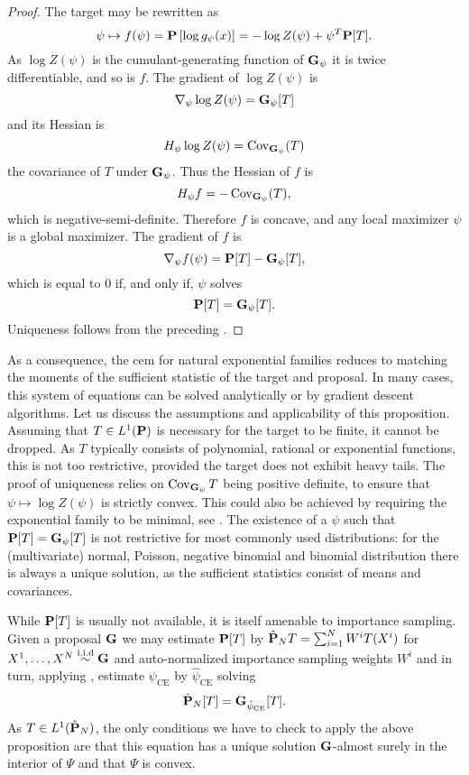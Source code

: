 \begin{proof}
    The target may be rewritten as
    $$
    \psi \mapsto f(\psi) = \P \left[\log g_{\psi}(x)\right]= -\log Z(\psi) + \psi^{T} \P [T].
    $$
    As $\log Z(\psi)$ is the cumulant-generating function of $\G_{\psi}$ it is twice differentiable, and so is $f$. The gradient of $\log Z(\psi)$ is 
    $$
    \nabla_{\psi} \log Z(\psi) = \G_{\psi} [T]
    $$
    and its Hessian is 
    $$
    H_{\psi} \log Z(\psi) = \cov_{\G_{\psi}} (T)
    $$
    the covariance of $T$ under $\G_{\psi}$. Thus the Hessian of $f$ is 
    $$
    H_{\psi} f = - \cov_{\G_{\psi}} (T),
    $$
    which is negative-semi-definite. Therefore $f$ is concave, and any local maximizer $\psi$ is a global maximizer. The gradient of $f$ is 
    $$
        \nabla_{\psi} f(\psi) = \P[T] - \G_{\psi} [T],
    $$
    which is equal to $0$ if, and only if, $\psi$ solves 
    $$
    \P[T] = \G_{\psi}[T].
    $$
    Uniqueness follows from the preceding .
\end{proof}
As a consequence, the \acrshort{cem} for natural exponential families reduces to matching the moments of the sufficient statistic of the target and proposal.
In many cases, this system of equations can be solved analytically or by gradient descent algorithms.
Let us discuss the assumptions and applicability of this proposition. Assuming that $T \in L^{1}(\P)$ is necessary for the target to be finite, it cannot be dropped. As $T$ typically consists of polynomial, rational or exponential functions, this is not too restrictive, provided the target does not exhibit heavy tails. The proof of uniqueness relies on $\cov_{\G_{\psi}} T$ being positive definite, to ensure that $\psi \mapsto \log Z(\psi)$ is strictly convex. This could also be achieved by requiring the exponential family to be minimal, see \citep[Theorem 1.13 (iv)]{Brown1986Fundamentals}. The existence of a $\psi$ such that $\P [T] = \G_{\psi} [T]$ is not restrictive for most commonly used distributions: for the (multivariate) normal, Poisson, negative binomial and binomial distribution there is always a unique solution, as the sufficient statistics consist of means and covariances. 

While $\P [T]$ is usually not available, it is itself amenable to importance sampling. Given a proposal $\G$ we may estimate $\P [T]$ by $\hat\P_N T = \sum_{i = 1}^{N} W^{i} T(X^{i})$ for $X^{1}, \dots, X^{N} \iid \G$ and auto-normalized importance sampling weights $W^{i}$ and in turn, applying , estimate $\psi_{\text{CE}}$ by $\hat \psi_{\text{CE}}$ solving
\begin{equation}
    \label{eq:ee_hpce}
\hat \P_N [T] = \G_{\hpce} [T].
\end{equation}
As $T \in L^{1}(\hat \P_{N})$, the only conditions we have to check to apply the above proposition are that this equation has a unique solution $\G$-almost surely in the interior of $\Psi$ and that $\Psi$ is convex. 

